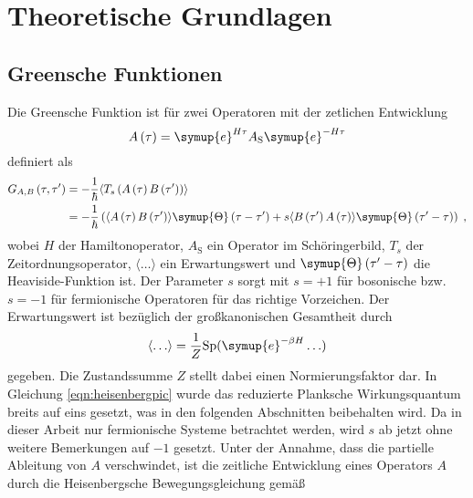 \chapter{Theoretische Grundlagen}
\label{chap:theoretische_grundlagen}
\section{Greensche Funktionen}
Die Greensche Funktion ist für zwei Operatoren mit der zetlichen Entwicklung 
\begin{equation}
    A \left ( \tau \right ) = \symup{e}^{H \tau} A_\text{S} \symup{e}^{-H \tau}  \label{eqn:heisenbergpic}
\end{equation}
definiert als 
\begin{align}
    G_{A,B} \left (\tau, \tau' \right ) &= - \frac{1}{\hbar} \langle T_s \left ( A \left (\tau \right ) B \left ( \tau' \right ) \right ) \rangle \\
    & = - \frac{1}{\hbar} \left(  \langle A \left (\tau \right ) B \left ( \tau' \right ) \rangle \symup{\Theta} \left ( \tau - \tau' \right) + s 
    \langle B \left ( \tau' \right ) A \left (\tau \right ) \rangle \symup{\Theta} \left ( \tau' - \tau \right)  \right ) \; \text{,} \label{eqn:greensfunction}
\end{align}
wobei $H$ der Hamiltonoperator, $A_\text{S}$ ein Operator im Schöringerbild, $T_s$ der Zeitordnungsoperator, 
$\langle \ldots \rangle$ ein Erwartungswert und $\symup{\Theta} \left ( \tau' - \tau \right)$ die Heaviside-Funktion ist.\cite{greensfunction}
Der Parameter $s$ sorgt mit $s=+1$ für bosonische bzw. $s=-1$ für fermionische Operatoren für das richtige Vorzeichen.
Der Erwartungswert ist bezüglich der großkanonischen Gesamtheit durch 
\begin{equation*}
    \langle \ldots \rangle = \frac{1}{Z} \text{Sp}(\symup{e}^{-\beta H} \ldots)
\end{equation*}
gegeben.\cite{greensfunction}
Die Zustandssumme $Z$ stellt dabei einen Normierungsfaktor dar.
In Gleichung \eqref{eqn:heisenbergpic} wurde das reduzierte Planksche Wirkungsquantum breits auf eins gesetzt, was in den folgenden Abschnitten beibehalten wird.
Da in dieser Arbeit nur fermionische Systeme betrachtet werden, wird $s$ ab jetzt ohne weitere Bemerkungen auf $-1$ gesetzt.
Unter der Annahme, dass die partielle Ableitung von $A$ verschwindet, ist die zeitliche Entwicklung eines Operators 
$A$ durch die Heisenbergsche Bewegungsgleichung gemäß 
